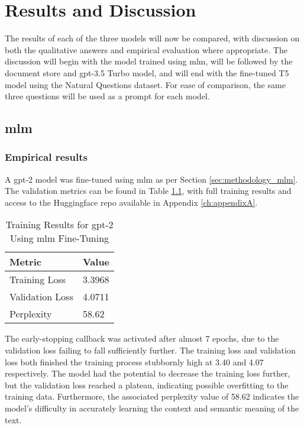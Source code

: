 \chapter{Results and Discussion}\label{ch:results}
The results of each of the three models will now be compared, with discussion on both the qualitative answers and empirical evaluation where appropriate. The discussion will begin with the model trained using \acrfull{mlm}, will be followed by the document store and \acrshort{gpt}-3.5 Turbo model, and will end with the fine-tuned T5 model using the Natural Questions dataset. For ease of comparison, the same three questions will be used as a prompt for each model.


\section{\acrlong{mlm}}\label{sec:results_mlm}
\subsection{Empirical results}
A \acrshort{gpt}-2 model was fine-tuned using \acrlong{mlm} as per Section \ref{sec:methodology_mlm}. The validation metrics can be found in Table \ref{tab:results_mlm}, with full training results and access to the Huggingface repo available in Appendix \ref{ch:appendixA}.

\begin{table}[h]
    \centering
    \begin{tabular}{l|l}
        \textbf{Metric} & \textbf{Value} \\ \hline
        Training Loss & 3.3968 \\ \hline
        Validation Loss & 4.0711 \\ \hline
        Perplexity & 58.62 \\
    \end{tabular}
    \caption{Training Results for \acrshort{gpt}-2 Using \acrshort{mlm} Fine-Tuning}
    \label{tab:results_mlm}
\end{table}

The early-stopping callback was activated after almost 7 epochs, due to the validation loss failing to fall sufficiently further. The training loss and validation loss both finished the training process stubbornly high at 3.40 and 4.07 respectively. The model had the potential to decrease the training loss further, but the validation loss reached a plateau, indicating possible overfitting to the training data. Furthermore, the associated perplexity value of 58.62 indicates the model's difficulty in accurately learning the context and semantic meaning of the text.


